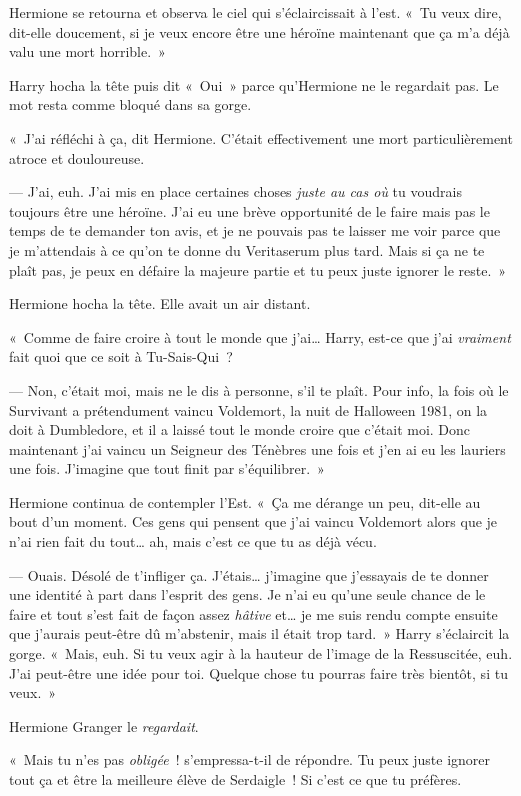 Hermione se retourna et observa le ciel qui s'éclaircissait à l'est.
«~Tu veux dire, dit-elle doucement, si je veux encore être une héroïne maintenant que ça m'a déjà valu une mort horrible.~»

Harry hocha la tête puis dit «~Oui~» parce qu'Hermione ne le regardait pas.
Le mot resta comme bloqué dans sa gorge.

«~J'ai réfléchi à ça, dit Hermione.
C'était effectivement une mort particulièrement atroce et douloureuse.

--- J'ai, euh.
J'ai mis en place certaines choses \emph{juste au cas où} tu voudrais toujours être une héroïne.
J'ai eu une brève opportunité de le faire mais pas le temps de te demander ton avis, et je ne pouvais pas te laisser me voir parce que je m'attendais à ce qu'on te donne du Veritaserum plus tard.
Mais si ça ne te plaît pas, je peux en défaire la majeure partie et tu peux juste ignorer le reste.~»

Hermione hocha la tête.
Elle avait un air distant.

«~Comme de faire croire à tout le monde que j'ai…
Harry, est-ce que j'ai \emph{vraiment} fait quoi que ce soit à Tu-Sais-Qui~?

--- Non, c'était moi, mais ne le dis à personne, s'il te plaît.
Pour info, la fois où le Survivant a prétendument vaincu Voldemort, la nuit de Halloween 1981, on la doit à Dumbledore, et il a laissé tout le monde croire que c'était moi.
Donc maintenant j'ai vaincu un Seigneur des Ténèbres une fois et j'en ai eu les lauriers une fois.
J'imagine que tout finit par s'équilibrer.~»

Hermione continua de contempler l'Est.
«~Ça me dérange un peu, dit-elle au bout d'un moment.
Ces gens qui pensent que j'ai vaincu Voldemort alors que je n'ai rien fait du tout… ah, mais c'est ce que tu as déjà vécu.

--- Ouais.
Désolé de t'infliger ça.
J'étais… j'imagine que j'essayais de te donner une identité à part dans l'esprit des gens.
Je n'ai eu qu'une seule chance de le faire et tout s'est fait de façon assez \emph{hâtive} et… je me suis rendu compte ensuite que j'aurais peut-être dû m'abstenir, mais il était trop tard.~»
Harry s'éclaircit la gorge.
«~Mais, euh.
Si tu veux agir à la hauteur de l'image de la Ressuscitée, euh.
J'ai peut-être une idée pour toi.
Quelque chose tu pourras faire très bientôt, si tu veux.~»

Hermione Granger le \emph{regardait}.

«~Mais tu n'es pas \emph{obligée}~! s'empressa-t-il de répondre.
Tu peux juste ignorer tout ça et être la meilleure élève de Serdaigle~!
Si c'est ce que tu préfères.

